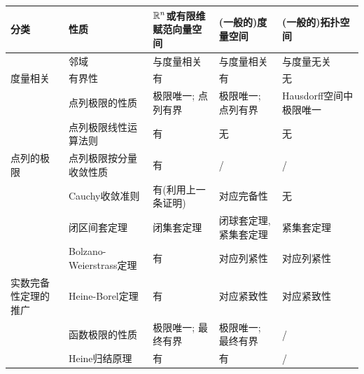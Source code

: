 \begin{table}[h]
	\small 
	\centering
	\renewcommand\arraystretch{1.4}
	\begin{tabular}{|l|l|p{2cm}|l|p{2cm}|}
	\hline
\multicolumn{1}{|l|}{{ 分类}}       & { 性质}                    & { $\mathbb{R} ^n$或有限维赋范向量空间} & { (一般的)度量空间} & (一般的)拓扑空间        \\ \hline
{ }                             & { 邻域}                    & { 与度量相关}                                          & { 与度量相关}     & 与度量无关            \\ 
\multirow{-2}{*}{{ 度量相关}}       & { 有界性}                   & { 有}                                              & { 有}         & 无                \\ \hline
{ }                             & { 点列极限的性质}               & { 极限唯一; 点列有界}                                      & { 极限唯一; 点列有界} & Hausdorff空间中极限唯一 \\
{ }                             & { 点列极限线性运算法则}            & { 有}                                              & { 无}         & 无                \\
\multirow{-3}{*}{{ 点列的极限}}      & { 点列极限按分量收敛性质}           & { 有}                                              & { /}         & /                \\ \hline
{ }                             & { Cauchy收敛准则}            & { 有(利用上一条证明)}                                     & { 对应完备性}     & 无                \\
{ }                             & { 闭区间套定理}             & { {闭集套定理}}                                        & { 闭球套定理, 紧集套定理} & 紧集套定理            \\
{ }                             & { Bolzano-Weierstrass定理} & { 有}                                              & { 对应列紧性}     & 对应列紧性            \\ 
\multirow{-4}{*}{{ 实数完备性定理的推广}} & { Heine-Borel定理}         & { 有}                                              & { 对应紧致性}     & 对应紧致性            \\ \hline
{ }                             & { 函数极限的性质}             & { 极限唯一; 最终有界}                                              & { 极限唯一; 最终有界}         & /                \\ 
{ }                             & { Heine归结原理}             & { 有}                                              & { 有}         & /                \\ 

\end{tabular}
\end{table}
